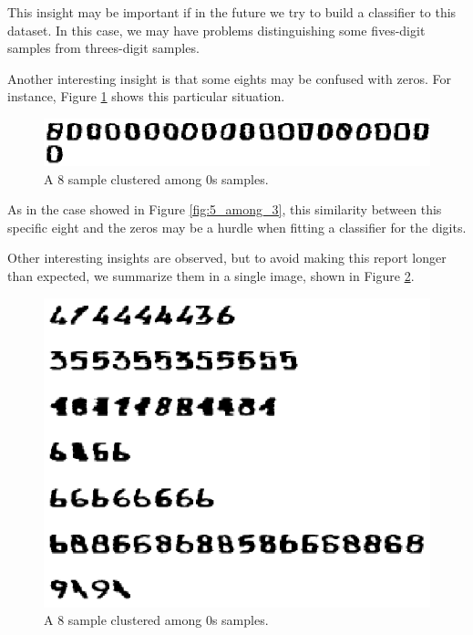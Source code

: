 \documentclass{article}
\begin{document}
This insight may be important if in the future we try to build a classifier to this dataset. In this case, we may have problems distinguishing some fives-digit samples from threes-digit samples.

Another interesting insight is that some eights may be confused with zeros. For instance, Figure \ref{fig:8_among_0} shows this particular situation. 

\begin{figure}[h!]
    \centering
    \includegraphics[width=\textwidth]{images/8_among_0s.png}
    \caption{A 8 sample clustered among 0s samples.}
    \label{fig:8_among_0}
\end{figure}

As in the case showed in Figure \ref{fig:5_among_3}, this similarity between this specific eight and the zeros may be a hurdle when fitting a classifier for the digits.

Other interesting insights are observed, but to avoid making this report longer than expected, we summarize them in a single image, shown in Figure \ref{fig:remaining_example}.

\begin{figure}[h!]
    \centering
    \includegraphics[scale=0.51]{images/remaining_examples.png}
    \caption{A 8 sample clustered among 0s samples.}
    \label{fig:remaining_example}
\end{figure}
\end{document}
